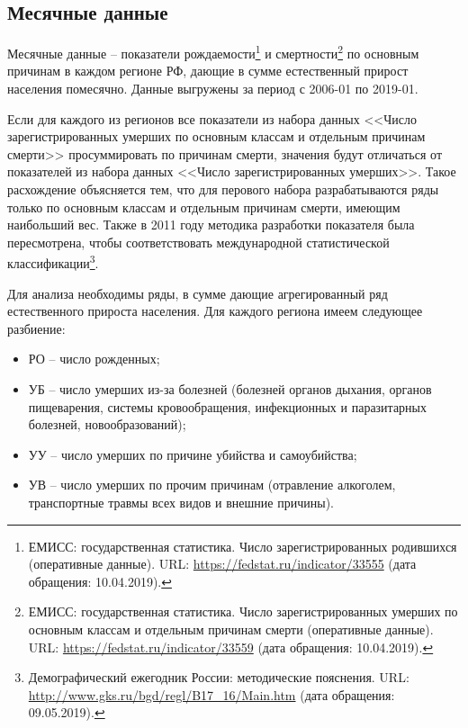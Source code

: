 \documentclass[12pt,a4paper, oneside]{extreport}
\begin{document}
\subsection{Месячные данные}

Месячные данные -- показатели рождаемости\footnote{ЕМИСС: государственная статистика. Число зарегистрированных родившихся (оперативные данные). URL: \url{https://fedstat.ru/indicator/33555} (дата обращения: 10.04.2019).} и смертности\footnote{ЕМИСС: государственная статистика. Число зарегистрированных умерших по основным классам и отдельным причинам смерти (оперативные данные). URL: \url{https://fedstat.ru/indicator/33559} (дата обращения: 10.04.2019).} по основным причинам  в каждом регионе РФ, дающие в сумме естественный прирост населения помесячно. 
Данные выгружены за период с 2006-01 по 2019-01. 


Если для каждого из регионов все показатели из набора данных <<Число зарегистрированных умерших по основным классам и отдельным причинам смерти>> просуммировать по причинам смерти, значения будут отличаться от показателей  из набора данных <<Число зарегистрированных умерших>>. Такое расхождение объясняется тем, что для перового набора  разрабатываются ряды только по   основным классам и отдельным причинам смерти, имеющим наибольший вес. Также в 2011 году методика разработки показателя была пересмотрена, чтобы соответствовать  международной статистической классификации\footnote{Демографический ежегодник России: методические пояснения. URL: \url{http://www.gks.ru/bgd/regl/B17\_16/Main.htm} (дата обращения: 09.05.2019).}. 

Для анализа необходимы ряды, в сумме дающие агрегированный ряд естественного прироста населения. Для каждого региона имеем следующее разбиение:   



\begin{itemize}
	\item  РО --    число рожденных;
	\item  УБ --  число умерших  из-за болезней (болезней органов дыхания, органов пищеварения, системы кровообращения, инфекционных и паразитарных болезней, новообразований);
\item УУ --   число умерших по причине убийства и самоубийства;
\item УВ --    число умерших по прочим причинам (отравление алкоголем, транспортные травмы всех видов и внешние причины).

\end{itemize}
\end{document}
